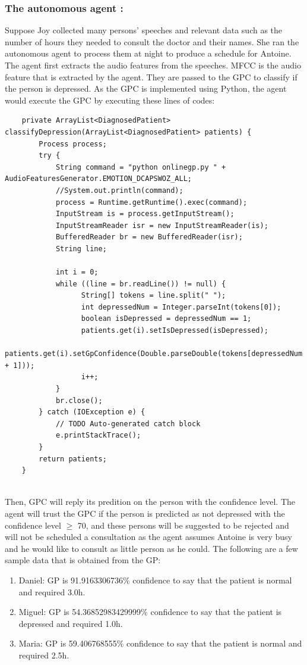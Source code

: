 \documentclass{article}
\begin{document}
	\subsubsection{The autonomous agent :}
	Suppose Joy collected many persons' speeches and relevant data such as the number of hours they needed to consult the doctor and their names. 
	She ran the autonomous agent to process them at night to produce a schedule for Antoine.
	The agent first extracts the audio features from the speeches.
	MFCC is the audio feature that is extracted by the agent. They are passed to the GPC to classify if the person is depressed. 
	As the GPC is implemented using Python, the agent would execute the GPC by executing these lines of codes:

	\begin{lstlisting}
	private ArrayList<DiagnosedPatient> classifyDepression(ArrayList<DiagnosedPatient> patients) {
		Process process;
		try {
			String command = "python onlinegp.py " + AudioFeaturesGenerator.EMOTION_DCAPSWOZ_ALL;
			//System.out.println(command);
			process = Runtime.getRuntime().exec(command);
			InputStream is = process.getInputStream();
			InputStreamReader isr = new InputStreamReader(is);
			BufferedReader br = new BufferedReader(isr);
			String line;
			
			int i = 0;
			while ((line = br.readLine()) != null) {
				  String[] tokens = line.split(" ");
				  int depressedNum = Integer.parseInt(tokens[0]);
				  boolean isDepressed = depressedNum == 1;
				  patients.get(i).setIsDepressed(isDepressed);
				  patients.get(i).setGpConfidence(Double.parseDouble(tokens[depressedNum + 1])); 
				  i++;
			}
			br.close();
		} catch (IOException e) {
			// TODO Auto-generated catch block
			e.printStackTrace();
		}
		return patients;
	}
	
	\end{lstlisting}

	Then, GPC will reply its predition on the person with the confidence level.
	The agent will trust the GPC if the person is predicted as not depressed with the confidence level \(\geq\) 70,
	and these persons will be suggested to be rejected and will not be scheduled a consultation as the agent assumes Antoine is very busy and 
	he would like to consult as little person as he could. 
	The following are a few sample data that is obtained from the GP:
	\begin{enumerate}
     	\item Daniel: GP is 91.9163306736\% confidence to say that the patient is normal and required 3.0h.
		\item Miguel: GP is 54.36852983429999\% confidence to say that the patient is depressed and required 1.0h.
		\item Maria: GP is 59.406768555\% confidence to say that the patient is normal and required 2.5h. \\
     	\end{enumerate}
\end{document}
